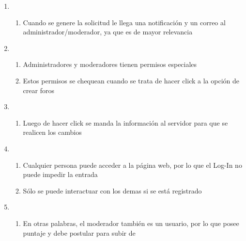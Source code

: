 \documentclass[12pt, letterpaper, notitlepage]{article}
\begin{document}
\begin{enumerate}
		\item {}
		\begin{enumerate}
			\item Cuando se genere la solicitud le llega una notificación y un correo al administrador/moderador, ya que es de mayor relevancia
		\end{enumerate}
		
		\item {}
		\begin{enumerate}
			\item Administradores y moderadores tienen permisos especiales
			\item Estos permisos se chequean cuando se trata de hacer click a la opción de crear foros
		\end{enumerate}
		
		\item {}
		\begin{enumerate}
			\item Luego de hacer click se manda la información al servidor para que se realicen los cambios
		\end{enumerate}
		
		\item {}
		\begin{enumerate}
			\item Cualquier persona puede acceder a la página web, por lo que el Log-In no puede impedir la entrada
			\item Sólo se puede interactuar con los demas si se está registrado
		\end{enumerate}				
		
		\item {}
		\begin{enumerate}
			\item En otras palabras, el moderador también es un usuario, por lo que posee puntaje y debe postular para subir de 
		\end{enumerate}
		

\end{enumerate}
\end{document}
